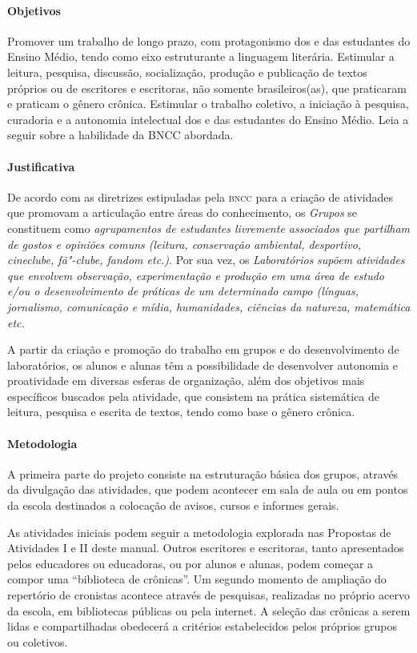 \documentclass[11pt]{extarticle}
\begin{document}
\paragraph{Objetivos} Promover um trabalho de longo prazo, com
protagonismo dos e das estudantes do Ensino Médio, tendo como eixo
estruturante a linguagem literária. Estimular a leitura, pesquisa,
discussão, socialização, produção e publicação de textos próprios ou de
escritores e escritoras, não somente brasileiros(as), que praticaram e
praticam o gênero crônica. Estimular o trabalho coletivo, a iniciação à
pesquisa, curadoria e a autonomia intelectual dos e das estudantes do
Ensino Médio.
Leia a seguir sobre a habilidade da BNCC abordada.


\paragraph{Justificativa} De acordo com as diretrizes estipuladas pela
\textsc{bncc} para a criação de atividades que promovam a articulação entre áreas
do conhecimento, os \textit{Grupos} se constituem como
\emph{agrupamentos de estudantes livremente associados que partilham de
gostos e opiniões comuns (leitura, conservação ambiental, desportivo,
cineclube, fã"-clube, fandom etc.)}. Por sua vez, os
\textit{Laboratórios} \emph{supõem atividades que envolvem observação,
experimentação e produção em uma área de estudo e/ou o desenvolvimento
de práticas de um determinado campo (línguas, jornalismo, comunicação e
mídia, humanidades, ciências da natureza, matemática etc.}

A partir da criação e promoção do trabalho em grupos e do
desenvolvimento de laboratórios, os alunos e alunas têm a possibilidade
de desenvolver autonomia e proatividade em diversas esferas de
organização, além dos objetivos mais específicos buscados pela
atividade, que consistem na prática sistemática de leitura, pesquisa e
escrita de textos, tendo como base o gênero crônica.

\paragraph{Metodologia} A primeira parte do projeto consiste na
estruturação básica dos grupos, através da divulgação das atividades,
que podem acontecer em sala de aula ou em pontos da escola destinados a
colocação de avisos, cursos e informes gerais.

As atividades iniciais podem seguir a metodologia explorada nas
Propostas de Atividades I e II deste manual. Outros escritores e
escritoras, tanto apresentados pelos educadores ou educadoras, ou por
alunos e alunas, podem começar a compor uma ``biblioteca de crônicas''.
Um segundo momento de ampliação do repertório de cronistas acontece
através de pesquisas, realizadas no próprio acervo da escola, em
bibliotecas públicas ou pela internet. A seleção das crônicas a serem
lidas e compartilhadas obedecerá a critérios estabelecidos pelos
próprios grupos ou coletivos.
\end{document}
